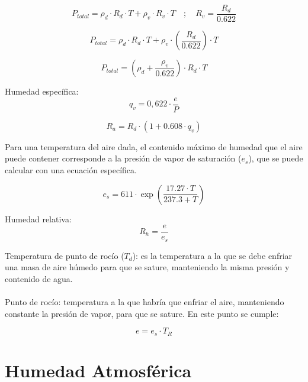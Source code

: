\begin{equation}
    P_{total} = \rho_d \cdot R_d \cdot T + \rho_v \cdot R_v \cdot T \quad ; \quad R_v = \frac{R_d}{0.622}
\end{equation}
    
\begin{equation}
    P_{total} = \rho_d \cdot R_d \cdot T + \rho_v \cdot \left(\frac{R_d}{0.622}\right) \cdot T
\end{equation}
    
\begin{equation}
    P_{total} = \left(\rho_d + \frac{\rho_v}{0.622}\right) \cdot R_d \cdot T
\end{equation}

Humedad específica: 
\begin{equation}
    q_v = 0,622 \cdot \frac{e}{P}
\end{equation}

\begin{equation}
    R_a = R_d \cdot \left(1 + 0.608 \cdot q_v \right)
\end{equation}

Para una temperatura del aire dada, el contenido máximo de humedad que el aire puede contener corresponde a la presión de vapor de saturación (\(e_s\)), que se puede calcular con una ecuación específica.

\begin{equation}
    e_s = 611 \cdot \exp\left(\frac{17.27 \cdot T}{237.3 + T}\right)
\end{equation}

Humedad relativa:
\begin{equation}
    R_h = \frac{e}{e_s}
\end{equation}

Temperatura de punto de rocío (\(T_d\)): es la temperatura a la que se debe enfriar una masa de aire húmedo para que se sature, manteniendo la misma presión y contenido de agua.
\\\\
Punto de rocío: temperatura a la que habría que enfriar el aire, manteniendo constante la presión de vapor, para que se sature. En este punto se cumple:

\begin{equation}
    e = e_s \cdot T_R
\end{equation}

\section{Humedad Atmosférica}

